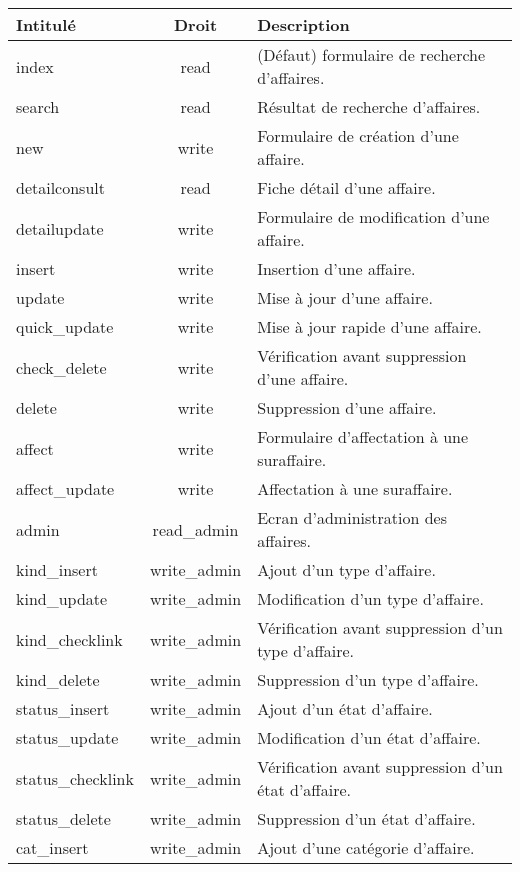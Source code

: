 \begin{tabular}{|l|c|p{9.5cm}|}
 \hline
 \textbf{Intitulé} & \textbf{Droit} & \textbf{Description} \\
 \hline
 \hline
  index & read & (Défaut) formulaire de recherche d'affaires. \\ 
 \hline
  search & read & Résultat de recherche d'affaires. \\
 \hline
  new & write & Formulaire de création d'une affaire. \\
 \hline
  detailconsult & read & Fiche détail d'une affaire. \\
 \hline
  detailupdate & write & Formulaire de modification d'une affaire. \\
 \hline
  insert & write & Insertion d'une affaire. \\
 \hline
  update & write & Mise à jour d'une affaire. \\
 \hline
  quick\_update & write & Mise à jour rapide d'une affaire. \\
 \hline
  check\_delete & write & Vérification avant suppression d'une affaire. \\
 \hline
  delete & write & Suppression d'une affaire. \\
 \hline
  affect & write & Formulaire d'affectation à une suraffaire. \\
 \hline
  affect\_update & write & Affectation à une suraffaire. \\
 \hline
  admin & read\_admin & Ecran d'administration des affaires. \\
 \hline
  kind\_insert & write\_admin & Ajout d'un type d'affaire. \\
 \hline
  kind\_update & write\_admin & Modification d'un type d'affaire. \\
 \hline
  kind\_checklink & write\_admin & Vérification avant suppression d'un type d'affaire. \\
 \hline
  kind\_delete & write\_admin & Suppression d'un type d'affaire. \\
 \hline
  status\_insert & write\_admin & Ajout d'un état d'affaire. \\
 \hline
  status\_update & write\_admin & Modification d'un état d'affaire. \\
 \hline
  status\_checklink & write\_admin & Vérification avant suppression d'un état d'affaire. \\
 \hline
  status\_delete & write\_admin & Suppression d'un état d'affaire. \\
 \hline
  cat\_insert & write\_admin & Ajout d'une catégorie d'affaire. \\

\end{tabular}

